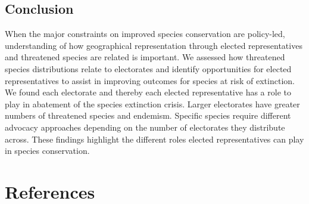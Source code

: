 \documentclass[a4paper,11pt]{article}
\begin{document}


\subsection{Conclusion}

When the major constraints on improved species conservation are policy-led, understanding of how geographical representation through elected representatives and threatened species are related is important. We assessed how threatened species distributions relate to electorates and identify opportunities for elected representatives to assist in improving outcomes for species at risk of extinction. We found each electorate and thereby each elected representative has a role to play in abatement of the species extinction crisis. Larger electorates have greater numbers of threatened species and endemism. Specific species require different advocacy approaches depending on the number of electorates they distribute across. These findings highlight the different roles elected representatives can play in species conservation.

\newpage
\nolinenumbers
\section{References}
\printbibliography
\end{document}
